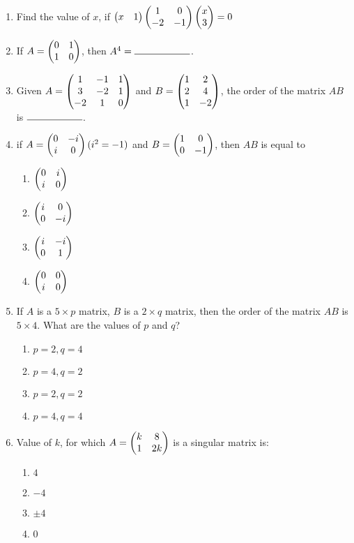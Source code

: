 \documentclass{article}
\begin{document}
\begin{enumerate}
    \item Find the value of $x$, if
    $\begin{pmatrix}x & 1\end{pmatrix}
    \begin{pmatrix}1 & 0 \\ -2 & -1\end{pmatrix}
    \begin{pmatrix}x \\ 3\end{pmatrix} = 0$
    
    \item If $A = \begin{pmatrix}0 & 1 \\ 1 & 0\end{pmatrix}$, then $A^4 = \rule{2cm}{0.15mm}$.

    \item Given $A = \begin{pmatrix}1 & -1 & 1 \\ 3 & -2 & 1 \\ -2 & 1 & 0\end{pmatrix}$ and
    $B = \begin{pmatrix}1 & 2 \\ 2 & 4 \\ 1 & -2\end{pmatrix}$, the order of the matrix $AB$ is $\rule{2cm}{0.15mm}$.
    
    \item if $A = \begin{pmatrix}0 & -i \\ i & 0\end{pmatrix} (i^2 = -1)$ and  $B = \begin{pmatrix}1 & 0 \\ 0 & -1\end{pmatrix}$, then $AB$ is equal to
    \begin{enumerate}
        \item $\begin{pmatrix}0 & i \\ i & 0\end{pmatrix}$
        \item $\begin{pmatrix}i & 0 \\ 0 & -i\end{pmatrix}$
        \item $\begin{pmatrix}i & -i \\ 0 & 1\end{pmatrix}$
        \item $\begin{pmatrix}0 & 0 \\ i & 0\end{pmatrix}$
    \end{enumerate}
   
   \item If $A$ is a $5 \times p$ matrix, $B$ is a $2 \times q$ matrix, then the order of the matrix $AB$ is $5 \times 4$. What are the values of $p$ and $q$?
   \begin{enumerate}
       \item $p = 2, q = 4$
       \item $p = 4, q = 2$
       \item $p = 2, q = 2$
       \item $p = 4, q = 4$
   \end{enumerate}

   \item Value of $k$, for which $A =\begin{pmatrix}k & 8 \\ 1 & 2k\end{pmatrix}$ is a singular matrix is:
    \begin{enumerate}
        \item $4$
        \item $-4$
        \item $\pm4$
        \item $0$
    \end{enumerate}
        


\end{enumerate}
\end{document}
